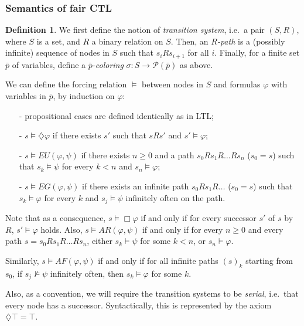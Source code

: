 \documentclass[11pt]{article}
\newcommand{\dia}{{\diamondsuit}}
\theoremstyle{definition}
\newtheorem{definition}{Definition}
\begin{document}
\subsubsection*{Semantics of fair CTL}\label{subsec:sem_CTLf}
\begin{definition}\label{forcing_rel_CTLf}
    We first define the notion of \emph{transition system}, i.e.\ a pair $(S,R)$, where $S$ is a set, and $R$ a binary relation on $S$. 
    Then, an \emph{$R$-path} is a (possibly infinite) sequence of nodes in $S$ such that $s_i R s_{i+1}$ for all $i$. 
    Finally, for a finite set $\bar{p}$ of variables, define a \emph{$\bar{p}$-coloring} $\sigma : S \to \mathcal{P}(\bar{p})$ as above.

    We can define the forcing relation $\models$ between nodes in $S$ and formulas $\varphi$ with variables in $\bar{p}$, by induction on $\varphi$:
    \begin{itemize}
        \setlength\itemsep{0em}
        \item[-] propositional cases are defined identically as in LTL;
        \item[-] $s\models \dia\varphi$ if there exists $s'$ such that $sRs'$ and $s'\models \varphi$;
        \item[-] $s\models EU(\varphi,\psi)$ if there exists $n\geq 0$ and a path $s_0Rs_1R\ldots Rs_n$ ($s_0=s$) such that $s_k\models\psi$ for every $k<n$ and $s_n\models\varphi$;
        \item[-] $s\models EG(\varphi,\psi)$ if there exists an infinite path $s_0Rs_1R\ldots $ ($s_0=s$) such that $s_k\models\varphi$ for every $k$ and $s_j\models\psi$ infinitely often on the path.       
    \end{itemize}

\end{definition}

Note that as a consequence, $s\models\Box\varphi$ if and only if for every successor $s'$ of $s$ by $R$, $s'\models\varphi$ holds.
Also, $s\models AR(\varphi,\psi)$ if and only if for every $n\geq 0$ and every path $s=s_0Rs_1R\ldots Rs_n$, either $s_k\models\psi$ for some $k<n$, or $s_n\models\varphi$.

Similarly, $s\models AF(\varphi,\psi)$ if and only if for all infinite paths ${(s)}_k$ starting from $s_0$, if $s_j\not\models\psi$ infinitely often, then $s_k\models\varphi$ for some $k$.

Also, as a convention, we will require the transition systems to be \emph{serial}, i.e.~that every node has a successor. Syntactically, this is represented by the axiom $\dia\top = \top$.
\end{document}
